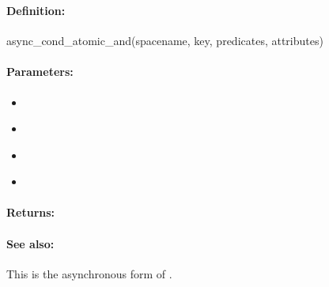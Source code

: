 \pagebreak
\subsubsection{}
\label{api:ruby:async_cond_atomic_and}


\paragraph{Definition:}
\begin{rubycode}
async_cond_atomic_and(spacename, key, predicates, attributes)
\end{rubycode}

\paragraph{Parameters:}
\begin{itemize}[noitemsep]
\item {}\\

\item {}\\

\item {}\\

\item {}\\

\end{itemize}

\paragraph{Returns:}


\paragraph{See also:}  This is the asynchronous form of .

\pagebreak
\subsubsection{}
\label{api:ruby:group_atomic_and}



